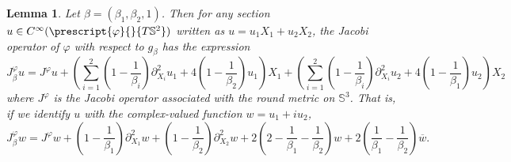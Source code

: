 \documentclass{article}
\numberwithin{equation}{section}        %
\theoremstyle{bfnote}
\newtheorem{lem}[thm]{Lemma}                %
\theoremstyle{definition}
\theoremstyle{bfremark}
\newcommand{\Sp}{\mathbb{S}}                %
\begin{document}
\begin{lem}     \label{lem: Jacobi operator for Hopf map with perturbation of metric}
    Let $\beta = (\beta_1,\beta_2,1)$. Then for any section $u \in C^\infty(\prescript{\varphi}{}{T\Sp^2})$ written as $u = u_1 X_1 + u_2 X_2$, the Jacobi operator of $\varphi$ with respect to $g_\beta$ has the expression
    \begin{equation*}
        J^{\varphi}_\beta u = J^{\varphi} u + \left(\sum_{i=1}^2 \left(1-\frac{1}{\beta_i}\right) \partial^2_{X_i} u_1 + 4 \left(1-\frac{1}{\beta_2}\right)u_1\right) X_1 + \left(\sum_{i=1}^2 \left(1-\frac{1}{\beta_i}\right) \partial^2_{X_i} u_2 + 4 \left(1-\frac{1}{\beta_1}\right)u_2\right) X_2
    \end{equation*}
    where $J^\varphi$ is the Jacobi operator associated with the round metric on $\Sp^3$. That is, if we identify $u$ with the complex-valued function $w = u_1+iu_2$, 
    \begin{equation*}
        J^\varphi_\beta w = J^\varphi w + \left(1-\frac{1}{\beta_1} \right) \partial_{X_1}^2 w + \left(1-\frac{1}{\beta_2}\right) \partial_{X_2}^2 w  + 2 \left(2-\frac{1}{\beta_1} - \frac{1}{\beta_2}\right) w + 2\left(\frac{1}{\beta_1}-\frac{1}{\beta_2}\right) \overline{w} .
    \end{equation*}
\end{lem}
\end{document}
